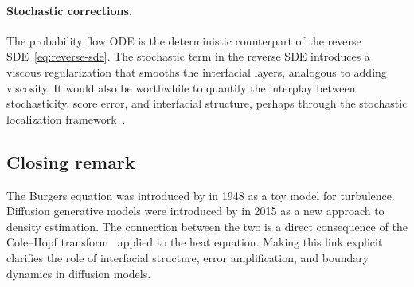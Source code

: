 \documentclass[11pt]{article}
\begin{document}
\paragraph{Stochastic corrections.}
The probability flow ODE is the deterministic counterpart of the reverse SDE~\eqref{eq:reverse-sde}.
The stochastic term in the reverse SDE introduces a viscous regularization that smooths the interfacial layers, analogous to adding viscosity.
It would also be worthwhile to quantify the interplay between stochasticity, score error, and interfacial structure, perhaps through the stochastic localization framework~\citep{montanari2023sampling, benton2024nearly}.

\subsection{Closing remark}

The Burgers equation was introduced by \citet{burgers1948mathematical} in 1948 as a toy model for turbulence.
Diffusion generative models were introduced by \citet{sohl2015deep} in 2015 as a new approach to density estimation.
The connection between the two is a direct consequence of the Cole--Hopf transform~\citep{hopf1950partial, cole1951quasi} applied to the heat equation.
Making this link explicit clarifies the role of interfacial structure, error amplification, and boundary dynamics in diffusion models.





\end{document}
